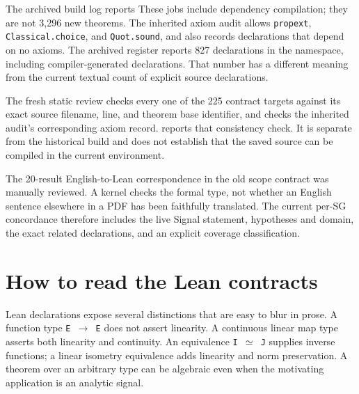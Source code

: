 \documentclass[11pt]{article}
\begin{document}
The archived build log reports \texttt{} These jobs include dependency compilation; they are not 3,296 new theorems. The inherited axiom audit allows \texttt{propext}, \texttt{Classical.choice}, and \texttt{Quot.sound}, and also records declarations that depend on no axioms. The archived register reports 827 declarations in the namespace, including compiler-generated declarations. That number has a different meaning from the current textual count of explicit source declarations.

The fresh static review checks every one of the 225 contract targets against its exact source filename, line, and theorem base identifier, and checks the inherited audit's corresponding axiom record. \texttt{} reports that consistency check. It is separate from the historical build and does not establish that the saved source can be compiled in the current environment.

The 20-result English-to-Lean correspondence in the old scope contract was manually reviewed. A kernel checks the formal type, not whether an English sentence elsewhere in a PDF has been faithfully translated. The current per-SG concordance therefore includes the live Signal statement, hypotheses and domain, the exact related declarations, and an explicit coverage classification.

\hypertarget{how-to-read-the-lean-contracts}{%
\section{How to read the Lean contracts}\label{how-to-read-the-lean-contracts}}

Lean declarations expose several distinctions that are easy to blur in prose. A function type \texttt{E \ensuremath{\to} E} does not assert linearity. A continuous linear map type asserts both linearity and continuity. An equivalence \texttt{I \ensuremath{\simeq} J} supplies inverse functions; a linear isometry equivalence adds linearity and norm preservation. A theorem over an arbitrary type can be algebraic even when the motivating application is an analytic signal.
\end{document}
